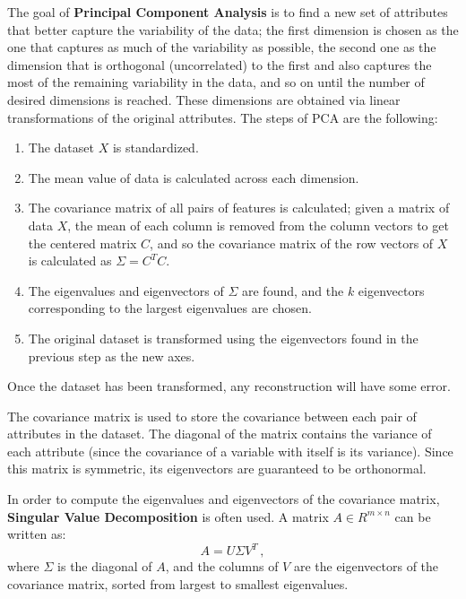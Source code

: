 The goal of \textbf{Principal Component Analysis} is to find a new set of attributes that better capture the variability of the data; the first dimension is chosen as the one that captures as much of the variability as possible, the second one as the dimension that is orthogonal (uncorrelated) to the first and also captures the most of the remaining variability in the data, and so on until the number of desired dimensions is reached. These dimensions are obtained via linear transformations of the original attributes. The steps of PCA are the following:
\begin{enumerate}
    \item The dataset $X$ is standardized.
    
    \item The mean value of data is calculated across each dimension.
    
    \item The covariance matrix of all pairs of features is calculated; given a matrix of data $X$, the mean of each column is removed from the column vectors to get the centered matrix $C$, and so the covariance matrix of the row vectors of $X$ is calculated as $\Sigma = C^TC$.
    
    \item The eigenvalues and eigenvectors of $\Sigma$ are found, and the $k$ eigenvectors corresponding to the largest eigenvalues are chosen.
    
    \item The original dataset is transformed using the eigenvectors found in the previous step as the new axes.
\end{enumerate}
Once the dataset has been transformed, any reconstruction will have some error.

The covariance matrix is used to store the covariance between each pair of attributes in the dataset. The diagonal of the matrix contains the variance of each attribute (since the covariance of a variable with itself is its variance). Since this matrix is symmetric, its eigenvectors are guaranteed to be orthonormal.

In order to compute the eigenvalues and eigenvectors of the covariance matrix, \textbf{Singular Value Decomposition} is often used. A matrix $A \in R^{m \times n}$ can be written as:
\begin{equation*}
    A = U \Sigma V^T \,,
\end{equation*}
where $\Sigma$ is the diagonal of $A$, and the columns of $V$ are the eigenvectors of the covariance matrix, sorted from largest to smallest eigenvalues.

